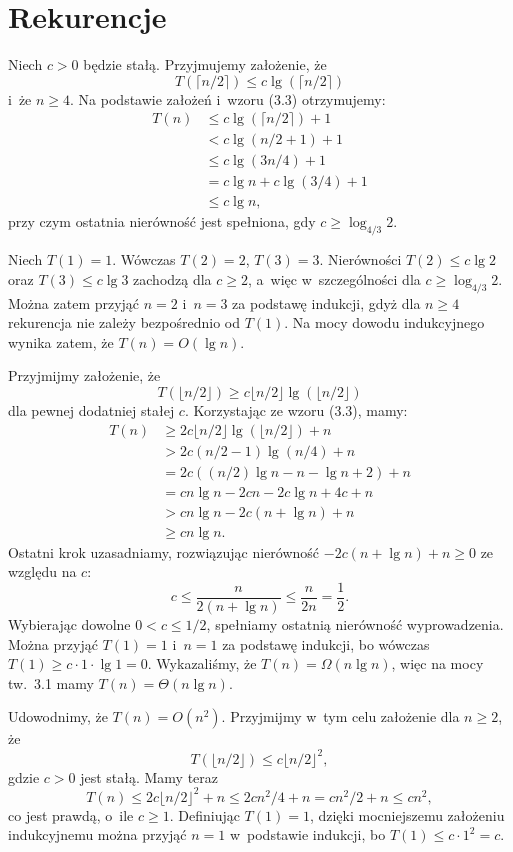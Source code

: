 \chapter{Rekurencje}


\exercise %
Niech $c>0$ będzie stałą.
Przyjmujemy założenie, że
\[
    T(\lceil n/2\rceil)\le c\lg(\lceil n/2\rceil)
\]
i~że $n\ge4$.
Na podstawie założeń i~wzoru (3.3) otrzymujemy:
\begin{align*}
	T(n) &\le c\lg(\lceil n/2\rceil)+1 \\
	&< c\lg(n/2+1)+1 \\
	&\le c\lg(3n/4)+1 \\
	&= c\lg n+c\lg(3/4)+1 \\
	&\le c\lg n,
\end{align*}
przy czym ostatnia nierówność jest spełniona, gdy $c\ge\log_{4/3}2$.

Niech $T(1)=1$.
Wówczas $T(2)=2$, $T(3)=3$.
Nierówności $T(2)\le c\lg2$ oraz $T(3)\le c\lg3$ zachodzą dla $c\ge2$, a~więc w~szczególności dla $c\ge\log_{4/3}2$.
Można zatem przyjąć $n=2$ i~$n=3$ za podstawę indukcji, gdyż dla $n\ge4$ rekurencja nie zależy bezpośrednio od $T(1)$.
Na mocy dowodu indukcyjnego wynika zatem, że $T(n)=O(\lg n)$.

\exercise %
Przyjmijmy założenie, że
\[
	T(\lfloor n/2\rfloor) \ge c\lfloor n/2\rfloor\lg(\lfloor n/2\rfloor)
\]
dla pewnej dodatniej stałej $c$.
Korzystając ze wzoru (3.3), mamy:
\begin{align*}
	T(n) &\ge 2c\lfloor n/2\rfloor\lg(\lfloor n/2\rfloor)+n \\
	&> 2c(n/2-1)\lg(n/4)+n \\
	&= 2c((n/2)\lg n-n-\lg n+2)+n \\
	&= cn\lg n-2cn-2c\lg n+4c+n \\
	&> cn\lg n-2c(n+\lg n)+n \\
	&\ge cn\lg n.
\end{align*}
Ostatni krok uzasadniamy, rozwiązując nierówność $-2c(n+\lg n)+n\ge0$ ze względu na $c$:
\[
	c \le \frac{n}{2(n+\lg n)} \le \frac{n}{2n} = \frac{1}{2}.
\]
Wybierając dowolne $0<c\le1/2$, spełniamy ostatnią nierówność wyprowadzenia.
Można przyjąć $T(1)=1$ i~$n=1$ za podstawę indukcji, bo wówczas $T(1)\ge c\cdot1\cdot\lg1=0$.
Wykazaliśmy, że $T(n)=\Omega(n\lg n)$, więc na mocy tw.\ 3.1 mamy $T(n)=\Theta(n\lg n)$.

\exercise %
Udowodnimy, że $T(n)=O(n^2)$.
Przyjmijmy w~tym celu założenie dla $n\ge2$, że
\[
    T(\lfloor n/2\rfloor) \le c\lfloor n/2\rfloor^2,
\]
gdzie $c>0$ jest stałą.
Mamy teraz
\[
	T(n) \le 2c\lfloor n/2\rfloor^2+n \le 2cn^2\!/4 + n = cn^2\!/2+n \le cn^2,
\]
co jest prawdą, o~ile $c\ge1$.
Definiując $T(1)=1$, dzięki mocniejszemu założeniu indukcyjnemu można przyjąć $n=1$ w~podstawie indukcji, bo $T(1)\le c\cdot1^2=c$.

